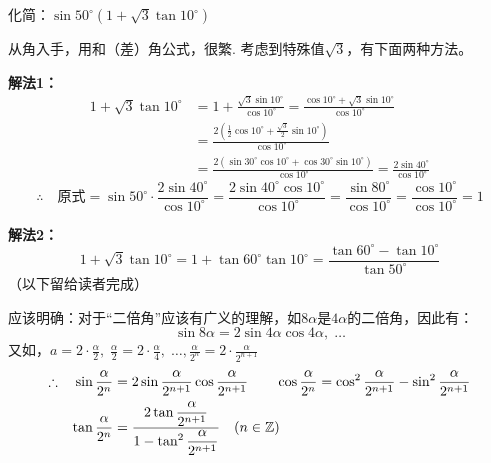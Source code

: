 \begin{example}
化简：$\sin50^{\circ}\left(1+\sqrt{3}\tan 10^{\circ}\right)$
\end{example}

\begin{analyze}
    从角入手，用和（差）角公式，很繁. 考虑到特殊值$\sqrt{3}$，有下面两种方法。
\end{analyze}



\begin{solution}
\textbf{解法1：}
\[\begin{split}
    1+\sqrt{3}\tan 10^{\circ}&=1+\frac{\sqrt{3}\sin10^{\circ}}{\cos 10^{\circ}}=\frac{\cos10^{\circ}+\sqrt{3}\sin 10^{\circ}}{\cos 10^{\circ}}\\
&=\frac{2\left(\frac{1}{2}\cos 10^{\circ}+\frac{\sqrt{3}}{2}\sin 10^{\circ}\right)}{\cos 10^{\circ}}\\
&=\frac{2(\sin30^{\circ}\cos 10^{\circ}+\cos 30^{\circ}\sin 10^{\circ})}{\cos 10^{\circ}}=\frac{2\sin 40^{\circ}}{\cos 10^{\circ}}
\end{split}\]
\[ \therefore\quad \text{原式}=\sin50^{\circ}\cdot \frac{2\sin40^{\circ}}{\cos 10^{\circ}}=\frac{2\sin 40^{\circ}\cos 10^{\circ}}{\cos 10^{\circ}}=\frac{\sin80^{\circ}}{\cos 10^{\circ}}=\frac{\cos 10^{\circ}}{\cos 10^{\circ}}=1\]

\textbf{解法2：}
\[1+\sqrt{3}\tan10^{\circ}=1+\tan 60^{\circ}\tan 10^{\circ}=\frac{\tan 60^{\circ}-\tan 10^{\circ}}{\tan 50^{\circ}}\]
（以下留给读者完成）
\end{solution}

应该明确：对于“二倍角”应该有广义的理解，如$8\alpha$是$4\alpha$的二倍角，因此有：
\[\sin8\alpha=2\sin4\alpha\cos4\alpha,\; \ldots\]
又如，$a=2\cdot \frac{\alpha}{2},\; \frac{\alpha}{2}=2\cdot \frac{\alpha}{4},\; \ldots, \frac{\alpha}{2^n}=2\cdot \frac{\alpha}{2^{n+1}}$
\[\begin{split}
    \therefore\quad \sin\dfrac{\alpha}{2^n}&=2\sin\dfrac{\alpha}{2^{n+1}}\cos\dfrac{\alpha}{2^{n+1}}\qquad
    \cos\dfrac{\alpha}{2^{n}}=\cos^2\dfrac{\alpha}{2^{n+1}}-\sin^2\dfrac{\alpha}{2^{n+1}}\\
    \tan\dfrac{\alpha}{2^{n}}&=\dfrac{2\tan\dfrac{\alpha}{2^{n+1}}}{1-\tan^2\dfrac{\alpha}{2^{n+1}}}\quad (n\in\mathbb{Z})
\end{split}\]

